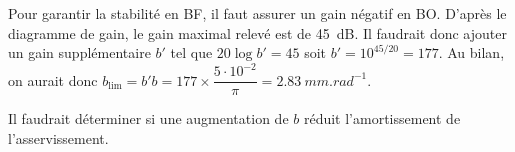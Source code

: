 \ifprof
\begin{corrige}
Pour garantir la stabilité en BF, il faut assurer un gain négatif en BO. D'après le diagramme de gain, le gain maximal relevé est de \SI{45}{dB}. Il faudrait donc ajouter un gain supplémentaire $b'$ tel que $20\log b' = 45$ soit $b'=10^{45/20}=177$. Au bilan, on aurait donc $b_{\text{lim}}=b' b = 177\times \dfrac{5\cdot 10^{-2}}{\pi}=
\SI{2,83}{mm.rad^{-1}}$.

Il faudrait déterminer si une augmentation de $b$ réduit l'amortissement de l'asservissement. 
\end{corrige}
\else
\fi




